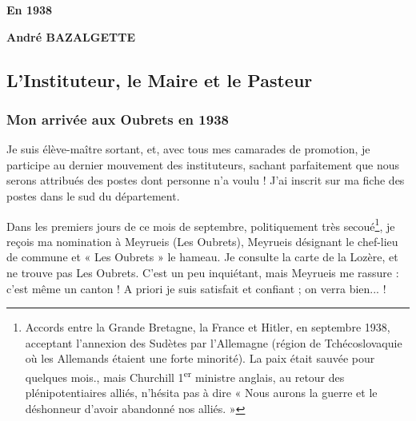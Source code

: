 


\begin{center}

\vspace{1cm}

{\Large\bfseries En 1938}

\vfill

\begin{flushright}
\textbf{André BAZALGETTE}
\end{flushright}

\end{center}


\subsection{L'Instituteur, le Maire et le Pasteur}

\subsubsection{Mon arrivée aux Oubrets en 1938}

Je suis élève-maître sortant, et, avec tous mes camarades de promotion, je participe au dernier mouvement des instituteurs, sachant parfaitement que nous serons attribués des postes dont personne n'a voulu ! J'ai inscrit sur ma fiche des postes dans le sud du département.

Dans les premiers jours de ce mois de septembre, politiquement très secoué\footnote{Accords entre la Grande Bretagne, la France et Hitler, en septembre 1938, acceptant l'annexion des Sudètes par l'Allemagne (région de Tchécoslovaquie où les Allemands étaient une forte minorité). La paix était sauvée pour quelques mois., mais Churchill 1\textsuperscript{er} ministre anglais, au retour des plénipotentiaires alliés, n'hésita pas à dire « Nous aurons la guerre et le déshonneur d'avoir abandonné nos alliés. »}, je reçois ma nomination à Meyrueis (Les Oubrets), Meyrueis désignant le chef-lieu de commune et « Les Oubrets » le hameau. Je consulte la carte de la Lozère, et ne trouve pas Les Oubrets. C'est un peu inquiétant, mais Meyrueis me rassure : c'est même un canton ! A priori je suis satisfait et confiant ; on verra bien... !

